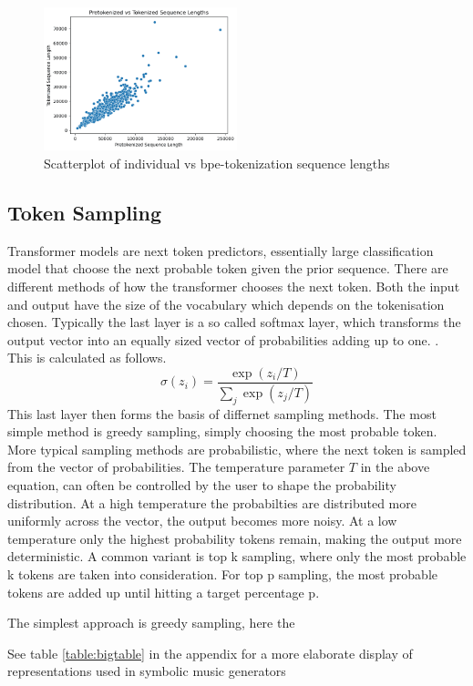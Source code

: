 \begin{figure}[H]
    \centering
    \includegraphics[width=0.5\textwidth]{IMAGES/scatter_pre_post_tok.png} 
    \caption{Scatterplot of individual vs bpe-tokenization sequence lengths}
    \label{fig:tok_compare}
\end{figure}

\subsection{Token Sampling} \label{section:token_sampling}
Transformer models are next token predictors, essentially large classification model that choose the next probable token given the prior sequence. There are different methods of how the transformer chooses the next token. Both the input and output have the size of the vocabulary which depends on the tokenisation chosen. Typically the last layer is a so called softmax layer, which transforms the output vector into an equally sized vector of probabilities adding up to one. \cite{Radford_Wu_Child_Luan_gpt2_2019}. This is calculated as follows. 
\begin{equation}
\sigma(z_i) = \frac{\exp(z_i / T)}{\sum_{j} \exp(z_j / T)}
\end{equation}
This last layer then forms the basis of differnet sampling methods. The most simple method is greedy sampling, simply choosing the most probable token. More typical sampling methods are probabilistic, where the next token is sampled from the vector of probabilities. The temperature parameter $T$ in the above equation, can often be controlled by the user to shape the probability distribution. At a high temperature the probabilties are distributed more uniformly across the vector, the output becomes more noisy. At a low temperature only the highest probability tokens remain, making the output more deterministic. 
A common variant is top k sampling, where only the most probable k tokens are taken into consideration. For top p sampling, the most probable tokens are added up until hitting a target percentage p. 

The simplest approach is greedy sampling, here the 

See table \ref{table:bigtable} in the appendix for a more elaborate display of representations used in symbolic music generators

\cite{Herremans_Chew_Morpheus_2019} 


